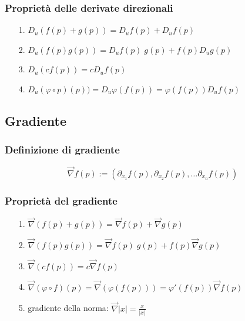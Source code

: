 \documentclass[a4paper]{article}
\begin{document}
\subsubsection*{Proprietà delle derivate direzionali}
\begin{itemize}[topsep=3pt, itemsep=0pt]
	\item[1.] \(D_u (f(p) + g(p)) = D_u f(p) + D_u f(p)\)
	\item[2.] \(D_u (f(p)g(p)) = D_u f(p) \; g(p) + f(p) D_u g(p)\)
	\item[3.] \(D_u (c f(p)) = c D_u f(p)\)
	\item[4.] \(D_u (\varphi \circ p)(p)) = D_u \varphi(f(p)) = \varphi(f(p)) D_u f(p)\)
\end{itemize}

\subsection{Gradiente}
\subsubsection*{Definizione di gradiente}
\[\vec{\nabla} f(p) := \left( \partial_{x_1} f(p), \partial_{x_2} f(p), \dots \partial_{x_n} f(p)\right)\]

\subsubsection*{Proprietà del gradiente} %
\begin{itemize}[topsep=3pt, itemsep=0pt]
	\item[1.] \(\vec{\nabla} (f(p) + g(p)) = \vec{\nabla} f(p) + \vec{\nabla} g(p)\)
	\item[2.] \(\vec{\nabla} (f(p) g(p)) = \vec{\nabla} f(p) \; g(p) + f(p) \vec{\nabla} g(p)\)
	\item[3.] \(\vec{\nabla} (c f(p)) = c \vec{\nabla} f(p)\)
	\item[4.] \(\vec{\nabla} (\varphi \circ f)(p) = \vec{\nabla} (\varphi(f(p))) = \varphi'(f(p)) \vec{\nabla} f(p)\)
	\item[5.] gradiente della norma: \(\displaystyle \vec{\nabla} \left|x\right| = \frac{x}{\left|x\right|}\)
\end{itemize}
\end{document}
